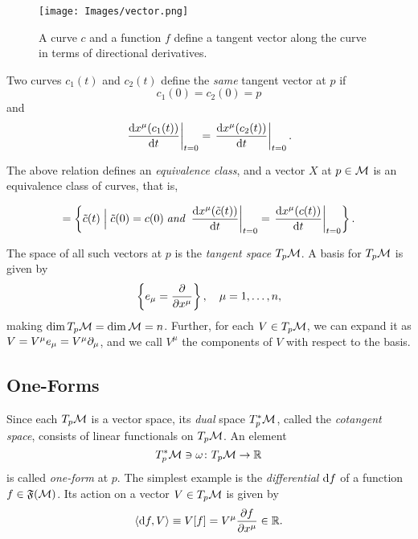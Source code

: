 \begin{figure}
	\centering
	\texttt{[image: Images/vector.png]}
	\caption{A curve $c$ and a function $f$ define a tangent vector along the curve in terms of directional derivatives.}
	\label{fig:vector}
\end{figure}

Two curves $c_1(t)$ and $c_2(t)$ define the \emph{same} tangent vector at $p$ if
\begin{equation}
	c_1(0)= c_2(0)=p
\end{equation}
and
\begin{equation}
	\left. \frac{\mathop{}\!\mathrm{d} x^\mu(c_1(t))}{\mathop{}\!\mathrm{d} t} \right|_{t=0} = \left. \frac{\mathop{}\!\mathrm{d} x^\mu(c_2(t))}{\mathop{}\!\mathrm{d} t} \right|_{t=0} .
\end{equation}

The above relation defines an \emph{equivalence class}, and a vector $X$ at $p\in\mathcal{M}$ is an equivalence class of curves, that is,

\begin{equation}
	[c(t)] = \left\{ \tilde{c}(t) \; \Big| \; \tilde{c}(0) = c(0) \; \textit{and} \; \left. \frac{\ud x^\mu (\tilde{c}(t))}{\ud t}\right|_{t=0} = \left. \frac{\ud x^\mu (c(t))}{\ud t}\right|_{t=0} \right\} .
\end{equation}

The space of all such vectors at $p$ is the \emph{tangent space} $T_p \mathcal{M}$. A basis for $T_p \mathcal{M}$ is given by
\begin{equation}
	\left\{ e_\mu = \frac{\partial}{\partial x^\mu} \right\}   , \quad \mu = 1, \dots, n,
\end{equation}
making $\dim T_p \mathcal{M} = \dim \mathcal{M} = n$. Further, for each $V \in T_p \mathcal{M}$, we can expand it as $V = V^\mu e_\mu = V^\mu \partial_\mu$, and we call $V^\mu$ the components of $V$ with respect to the basis.

\subsection{One-Forms}
Since each $T_p \mathcal{M}$ is a vector space, its \emph{dual} space $T^*_p \mathcal{M}$, called the \emph{cotangent space}, consists of linear functionals on $T_p \mathcal{M}$. An element 
\begin{equation}
    T^*_p \mathcal{M} \ni \omega \colon T_p \mathcal{M} \to \mathbb{R}
\end{equation}
is called \emph{one-form} at $p$. The simplest example is the \emph{differential} $\mathop{}\!\mathrm{d} f$ of a function $f \in \mathfrak{F}(\mathcal{M})$. Its action on a vector $V \in T_p \mathcal{M}$ is given by
\begin{equation}
	\langle \mathop{}\!\mathrm{d} f, V \rangle \equiv V[f] = V^\mu \frac{\partial f}{\partial x^\mu} \in \mathbb{R}.
\end{equation}

